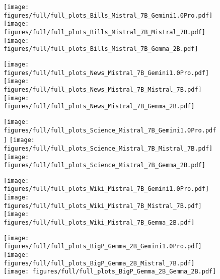 \begin{figure}[H]
    \centering
    \texttt{[image: figures/full/full\_plots\_Bills\_Mistral\_7B\_Gemini1.0Pro.pdf]}
    \texttt{[image: figures/full/full\_plots\_Bills\_Mistral\_7B\_Mistral\_7B.pdf]}
    \texttt{[image: figures/full/full\_plots\_Bills\_Mistral\_7B\_Gemma\_2B.pdf]}
    \label{fig:full_mistral_bills}
\end{figure}

\begin{figure}[H]
    \centering
    \texttt{[image: figures/full/full\_plots\_News\_Mistral\_7B\_Gemini1.0Pro.pdf]}
    \texttt{[image: figures/full/full\_plots\_News\_Mistral\_7B\_Mistral\_7B.pdf]}
    \texttt{[image: figures/full/full\_plots\_News\_Mistral\_7B\_Gemma\_2B.pdf]}
    \label{fig:full_mistral_news}
\end{figure}

\begin{figure}[H]
    \centering
    \texttt{[image: figures/full/full\_plots\_Science\_Mistral\_7B\_Gemini1.0Pro.pdf]}
    \texttt{[image: figures/full/full\_plots\_Science\_Mistral\_7B\_Mistral\_7B.pdf]}
    \texttt{[image: figures/full/full\_plots\_Science\_Mistral\_7B\_Gemma\_2B.pdf]}
    \label{fig:full_mistral_science}
\end{figure}

\begin{figure}[H]
    \centering
    \texttt{[image: figures/full/full\_plots\_Wiki\_Mistral\_7B\_Gemini1.0Pro.pdf]}
    \texttt{[image: figures/full/full\_plots\_Wiki\_Mistral\_7B\_Mistral\_7B.pdf]}
    \texttt{[image: figures/full/full\_plots\_Wiki\_Mistral\_7B\_Gemma\_2B.pdf]}
    \label{fig:full_mistral_wiki}
\end{figure}



\begin{figure}[H]
    \centering
    \texttt{[image: figures/full/full\_plots\_BigP\_Gemma\_2B\_Gemini1.0Pro.pdf]}
    \texttt{[image: figures/full/full\_plots\_BigP\_Gemma\_2B\_Mistral\_7B.pdf]}
    \texttt{[image: figures/full/full\_plots\_BigP\_Gemma\_2B\_Gemma\_2B.pdf]}
    \label{fig:full_gemma_bigp}
\end{figure}


